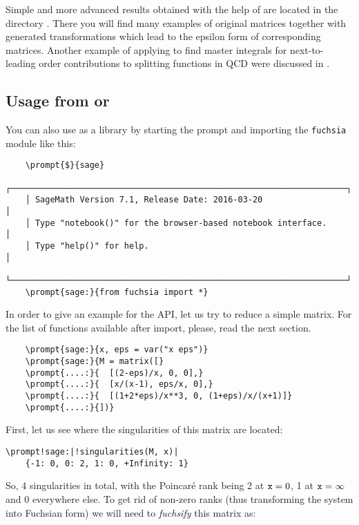 \documentclass[12pt,a4paper]{article}
\begin{document}
Simple and more advanced results obtained with the help of \fuchsia are located in the directory .
There you will find many examples of original matrices together with generated transformations which lead to the epsilon form of corresponding matrices.
Another example of applying \fuchsia to find master integrals for next-to-leading order contributions to splitting functions in QCD were discussed in \cite{GM16}.

\subsection{Usage from \sage or \python}
\label{sec:usage_py}

You can also use \fuchsia as a library by starting the \sage prompt and importing the \texttt{fuchsia} module like this:

\begin{Verbatim}
    \prompt{$}{sage}
    ┌────────────────────────────────────────────────────────────────────┐
    │ SageMath Version 7.1, Release Date: 2016-03-20                     │
    │ Type "notebook()" for the browser-based notebook interface.        │
    │ Type "help()" for help.                                            │
    └────────────────────────────────────────────────────────────────────┘
    \prompt{sage:}{from fuchsia import *}
\end{Verbatim}

In order to give an example for the API, let us try to reduce a simple matrix.
For the list of functions available after import, please, read the next section.

\begin{Verbatim}
    \prompt{sage:}{x, eps = var("x eps")}
    \prompt{sage:}{M = matrix([}
    \prompt{....:}{  [(2-eps)/x, 0, 0],}
    \prompt{....:}{  [x/(x-1), eps/x, 0],}
    \prompt{....:}{  [(1+2*eps)/x**3, 0, (1+eps)/x/(x+1)]}
    \prompt{....:}{])}
\end{Verbatim}

First, let us see where the singularities of this matrix are located:

\begin{Verbatim}[commandchars=\\!|]
    \prompt!sage:|!singularities(M, x)|
    {-1: 0, 0: 2, 1: 0, +Infinity: 1}
\end{Verbatim}

So, 4 singularities in total, with the Poincar\'e rank being 2 at $\texttt{x}=0$, 1 at $\texttt{x}=\infty$ and 0 everywhere else.
To get rid of non-zero ranks (thus transforming the system into Fuchsian form) we will need to \textit{fuchsify} this matrix as:
\end{document}
